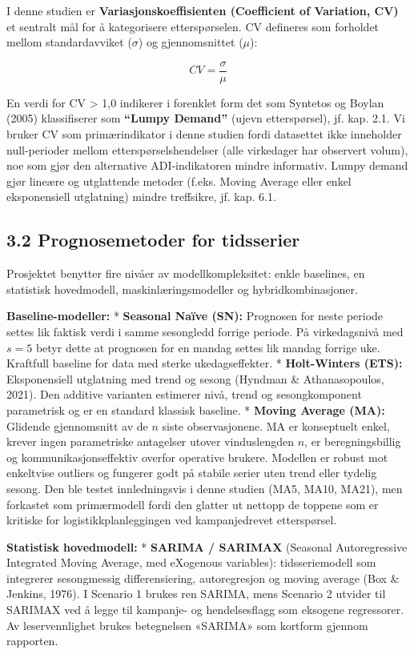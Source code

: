 \documentclass[
  norsk,
  11pt,
  a4paper,
]{article}
\begin{document}
I denne studien er \textbf{Variasjonskoeffisienten (Coefficient of
Variation, CV)} et sentralt mål for å kategorisere etterspørselen. CV
defineres som forholdet mellom standardavviket (\(\sigma\)) og
gjennomsnittet (\(\mu\)):

\[CV = \frac{\sigma}{\mu}\]

En verdi for CV \textgreater{} 1,0 indikerer i forenklet form det som
Syntetos og Boylan (2005) klassifiserer som \textbf{``Lumpy Demand''}
(ujevn etterspørsel), jf. kap. 2.1. Vi bruker CV som primærindikator i
denne studien fordi datasettet ikke inneholder null-perioder mellom
etterspørselshendelser (alle virkedager har observert volum), noe som
gjør den alternative ADI-indikatoren mindre informativ. Lumpy demand
gjør lineære og utglattende metoder (f.eks. Moving Average eller enkel
eksponensiell utglatning) mindre treffsikre, jf. kap. 6.1.

\subsection{3.2 Prognosemetoder for
tidsserier}\label{prognosemetoder-for-tidsserier}

Prosjektet benytter fire nivåer av modellkompleksitet: enkle baselines,
en statistisk hovedmodell, maskinlæringsmodeller og hybridkombinasjoner.

\textbf{Baseline-modeller:} * \textbf{Seasonal Naïve (SN):} Prognosen
for neste periode settes lik faktisk verdi i samme sesongledd forrige
periode. På virkedagsnivå med \(s=5\) betyr dette at prognosen for en
mandag settes lik mandag forrige uke. Kraftfull baseline for data med
sterke ukedagseffekter. * \textbf{Holt-Winters (ETS):} Eksponensiell
utglatning med trend og sesong (Hyndman \& Athanasopoulos, 2021). Den
additive varianten estimerer nivå, trend og sesongkomponent parametrisk
og er en standard klassisk baseline. * \textbf{Moving Average (MA):}
Glidende gjennomsnitt av de \(n\) siste observasjonene. MA er
konseptuelt enkel, krever ingen parametriske antagelser utover
vinduslengden \(n\), er beregningsbillig og kommunikasjonseffektiv
overfor operative brukere. Modellen er robust mot enkeltvise outliers og
fungerer godt på stabile serier uten trend eller tydelig sesong. Den ble
testet innledningsvis i denne studien (MA5, MA10, MA21), men forkastet
som primærmodell fordi den glatter ut nettopp de toppene som er kritiske
for logistikkplanleggingen ved kampanjedrevet etterspørsel.

\textbf{Statistisk hovedmodell:} * \textbf{SARIMA / SARIMAX} (Seasonal
Autoregressive Integrated Moving Average, med eXogenous variables):
tidsseriemodell som integrerer sesongmessig differensiering,
autoregresjon og moving average (Box \& Jenkins, 1976). I Scenario 1
brukes ren SARIMA, mens Scenario 2 utvider til SARIMAX ved å legge til
kampanje- og hendelsesflagg som eksogene regressorer. Av leservennlighet
brukes betegnelsen «SARIMA» som kortform gjennom rapporten.
\end{document}
